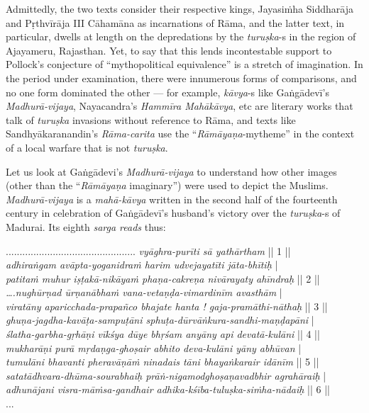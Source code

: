 Admittedly, the two texts consider their respective kings, Jayasiṁha Siddharāja and Pṛthvīrāja III Cāhamāna as incarnations of Rāma, and the latter text, in particular, dwells at length on the depredations by the {\sl turuṣka}-s in the region of Ajayameru, Rajasthan. Yet, to say that this lends incontestable support to Pollock’s conjecture of “mythopolitical equivalence” is a stretch of imagination. In the period under examination, there were innumerous forms of comparisons, and no one form dominated the other — for example, {\sl kāvya}-s like Gaṅgādevī’s {\sl Madhurā-vijaya}, Nayacandra’s {\sl Hammīra Mahākāvya}, etc are literary works that talk of {\sl turuṣka} invasions without reference to Rāma, and texts like Sandhyākaranandin’s {\sl Rāma-carita} use the “{\sl Rāmāyaṇa}-mytheme” in the context of a local warfare that is not {\sl turuṣka}.

Let us look at Gaṅgādevi’s {\sl Madhurā-vijaya} to understand how other images (other than the “{\sl Rāmāyaṇa} imaginary”) were used to depict the Muslims. {\sl Madhurā-vijaya} is a {\sl mahā-kāvya} written in the second half of the fourteenth century in celebration of Gaṅgādevī’s husband’s victory over the {\sl turuṣka}-s of Madurai. Its eighth {\sl sarga reads} thus: 

\begin{myquote} 
............................................... {{\sl vyāghra-purīti sā yathārtham}} || 1 ||\\
{\sl adhiraṅgam avāpta-yoganidraṁ harim udvejayatīti jāta-bhītiḥ} |\\
{\sl patitaṁ muhur iṣṭakā-nikāyaṁ phaṇa-cakreṇa nivārayaty ahīndraḥ} || 2 ||\\
{\sl ….nughūrṇad ūrṇanābhaṁ vana-vetaṇḍa-vimardinīm avasthām} |\\
{\sl viratāny aparicchada-prapañco bhajate hanta ! gaja-pramāthi-nāthaḥ} || 3 ||\\ 
{\sl ghuṇa-jagdha-kavāṭa-sampuṭāni sphuṭa-dūrvāṅkura-sandhi-maṇḍapāni} |\\
{\sl ślatha-garbha-gṛhāṇi vīkśya dūye bhṛśam anyāny api devatā-kulāni} || 4 ||\\
{\sl mukharāṇi purā mṛdaṇga-ghoṣair abhito deva-kulāni yāny abhūvan} |\\
{\sl tumulāni bhavanti pheravāṇāṁ ninadais tāni bhayaṅkarair idānīm} || 5 ||\\
{\sl satatādhvara-dhūma-sourabhaiḥ prāṅ-nigamodghoṣaṇavadbhir agrahāraiḥ} |\\
{\sl adhunājani visra-māṁsa-gandhair adhika-kśība-tuluṣka-siṁha-nādaiḥ} || 6 ||\\
\hspace{5cm} ...\qquad
\end{myquote}

